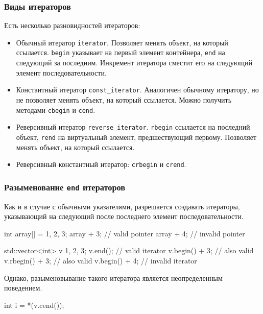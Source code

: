 \documentclass[compress, 8pt]{beamer}
\begin{document}
  \begin{frame}[fragile]

    \frametitle{Виды итераторов}

    Есть несколько разновидностей итераторов:

    \hfill \break
    \begin{itemize}

      \item Обычный итератор \texttt{iterator}.
        Позволяет менять объект, на который ссылается.
        \texttt{begin} указывает на первый элемент
        контейнера, \texttt{end} на следующий за последним.
        Инкремент итератора сместит его на следующий элемент
        последовательности.

      \item Константный итератор \texttt{const\_iterator}.
        Аналогичен обычному итератору, но не позволяет менять
        объект, на который ссылается.
        Можно получить методами \texttt{cbegin} и \texttt{cend}.

      \item Реверсивный итератор \texttt{reverse\_iterator}.
        \texttt{rbegin} ссылается на последний объект,
        \texttt{rend} \textemdash \space на виртуальный элемент, предшествующий
        первому.
        Позволяет менять объект, на который ссылается.

      \item Реверсивный константный итератор: \texttt{crbegin} и
        \texttt{crend}.
    \end{itemize}

  \end{frame}

  \begin{frame}[fragile]

    \frametitle{Разыменование \texttt{end} итераторов}

    Как и в случае с обычными указателями, разрешается создавать
    итераторы, указывающий на следующий после последнего элемент
    последовательности.

    \begin{mycppinplacelisting}
int array[] = {1, 2, 3};
array + 3; // valid pointer
array + 4; // invalid pointer

std::vector<int> v {1, 2, 3};
v.end(); // valid iterator
v.begin() + 3; // also valid
v.rbegin() + 3; // also valid
v.begin() + 4; // invalid iterator
    \end{mycppinplacelisting}

    Однако, разыменовывание такого итератора является
    неопределенным поведением.

    \begin{mycppinplacelisting}
int i = *(v.cend());
    \end{mycppinplacelisting}

  \end{frame}
\end{document}
